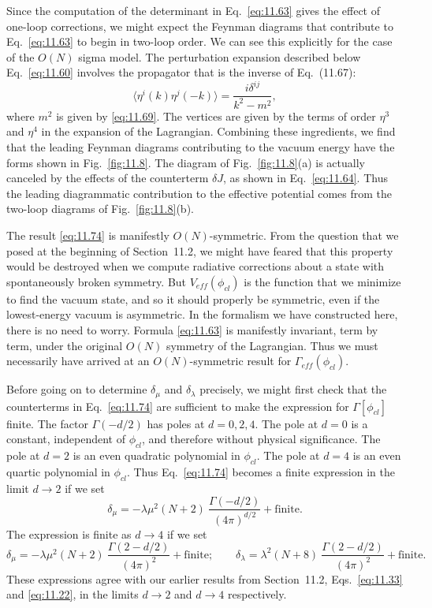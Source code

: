 Since the computation of the determinant in Eq.~\eqref{eq:11.63} gives the
effect of one-loop corrections, we might expect the Feynman diagrams that
contribute to Eq.~\eqref{eq:11.63} to begin in two-loop order.  We can see
this explicitly for the case of the $O(N)$ sigma model.  The perturbation
expansion described below Eq.~\eqref{eq:11.60} involves the propagator that
is the inverse of Eq.~(11.67):
\begin{equation}
  \langle \eta^i(k)\eta^j(-k) \rangle = \frac{i\delta^{ij}}{k^2 - m^2} ,
  \label{eq:11.75}
\end{equation}
where $m^2$ is given by \eqref{eq:11.69}.  The vertices are given by the
terms of order $\eta^3$ and $\eta^4$ in the expansion of the Lagrangian.
Combining these ingredients, we find that the leading Feynman diagrams
contributing to the vacuum energy have the forms shown in Fig.~\ref{fig:11.8}.
The diagram of Fig.~\ref{fig:11.8}(a) is actually canceled by the effects of
the counterterm $\delta J$, as shown in Eq.~\eqref{eq:11.64}.  Thus the
leading diagrammatic contribution to the effective potential comes from the
two-loop diagrams of Fig.~\ref{fig:11.8}(b).

The result \eqref{eq:11.74} is manifestly $O(N)$-symmetric.  From the
question that we posed at the beginning of Section~11.2, we might have feared
that this property would be destroyed when we compute radiative corrections
about a state with spontaneously broken symmetry.  But $V_{eff}(\phi_{cl})$
is the function that we minimize to find the vacuum state, and so it should
properly be symmetric, even if the lowest-energy vacuum is asymmetric.  In
the formalism we have constructed here, there is no need to worry.  Formula
\eqref{eq:11.63} is manifestly invariant, term by term, under the original
$O(N)$ symmetry of the Lagrangian.  Thus we must necessarily have arrived at
an $O(N)$-symmetric result for $\Gamma_{eff}(\phi_{cl})$.

Before going on to determine $\delta_\mu$ and $\delta_\lambda$ precisely, we
might first check that the counterterms in Eq.~\eqref{eq:11.74} are sufficient
to make the expression for $\Gamma[\phi_{cl}]$ finite.  The factor
$\Gamma(-d/2)$ has poles at $d = 0, 2, 4$.  The pole at $d = 0$ is a constant,
independent of $\phi_{cl}$, and therefore without physical significance.  The
pole at $d = 2$ is an even quadratic polynomial in $\phi_{cl}$.  The pole at
$d = 4$ is an even quartic polynomial in $\phi_{cl}$.  Thus Eq.~\eqref{eq:11.74}
becomes a finite expression in the limit $d\to 2$ if we set
\begin{equation}
  \delta_\mu = -\lambda\mu^2(N+2)\ \frac{\Gamma(-d/2)}{(4\pi)^{d/2}}
    + \text{finite} .
\end{equation}
The expression is finite as $d\to 4$ if we set
\begin{equation}
  \delta_\mu = -\lambda\mu^2(N+2)\ \frac{\Gamma(2-d/2)}{(4\pi)^2}
    + \text{finite};\qquad
  \delta_\lambda = \lambda^2(N+8)\ \frac{\Gamma(2-d/2)}{(4\pi)^2}
    + \text{finite} .
  \label{eq:11.76}
\end{equation}
These expressions agree with our earlier results from Section~11.2,
Eqs.~\eqref{eq:11.33} and \eqref{eq:11.22}, in the limits $d\to 2$ and
$d\to 4$ respectively.

